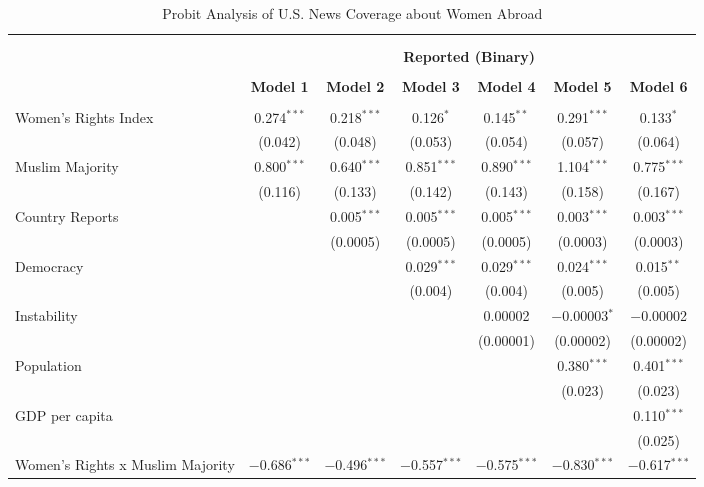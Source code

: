 
\begin{table}[!htbp] \centering 
  \caption{Probit Analysis of U.S. News Coverage about Women Abroad} 
  \label{table:probit} 
\begin{tabular}{@{\extracolsep{5pt}}lcccccc} 
\\[-1.8ex]\hline \\[-1.8ex] 
\\[-1.8ex] & \multicolumn{6}{c}{\textbf{Reported (Binary)}} \\ 
\\[-1.8ex] & \textbf{Model 1} & \textbf{Model 2} & \textbf{Model 3} & \textbf{Model 4} & \textbf{Model 5} & \textbf{Model 6}\\ 
\hline \\[-1.8ex] 
 Women's Rights Index & 0.274$^{***}$ & 0.218$^{***}$ & 0.126$^{*}$ & 0.145$^{**}$ & 0.291$^{***}$ & 0.133$^{*}$ \\ 
  & (0.042) & (0.048) & (0.053) & (0.054) & (0.057) & (0.064) \\ 
  Muslim Majority & 0.800$^{***}$ & 0.640$^{***}$ & 0.851$^{***}$ & 0.890$^{***}$ & 1.104$^{***}$ & 0.775$^{***}$ \\ 
  & (0.116) & (0.133) & (0.142) & (0.143) & (0.158) & (0.167) \\ 
  Country Reports &  & 0.005$^{***}$ & 0.005$^{***}$ & 0.005$^{***}$ & 0.003$^{***}$ & 0.003$^{***}$ \\ 
  &  & (0.0005) & (0.0005) & (0.0005) & (0.0003) & (0.0003) \\ 
  Democracy &  &  & 0.029$^{***}$ & 0.029$^{***}$ & 0.024$^{***}$ & 0.015$^{**}$ \\ 
  &  &  & (0.004) & (0.004) & (0.005) & (0.005) \\ 
  Instability &  &  &  & 0.00002 & $-$0.00003$^{*}$ & $-$0.00002 \\ 
  &  &  &  & (0.00001) & (0.00002) & (0.00002) \\ 
  Population &  &  &  &  & 0.380$^{***}$ & 0.401$^{***}$ \\ 
  &  &  &  &  & (0.023) & (0.023) \\ 
  GDP per capita &  &  &  &  &  & 0.110$^{***}$ \\ 
  &  &  &  &  &  & (0.025) \\ 
  Women's Rights x Muslim Majority & $-$0.686$^{***}$ & $-$0.496$^{***}$ & $-$0.557$^{***}$ & $-$0.575$^{***}$ & $-$0.830$^{***}$ & $-$0.617$^{***}$ \\ 

\end{tabular}
\end{table}
